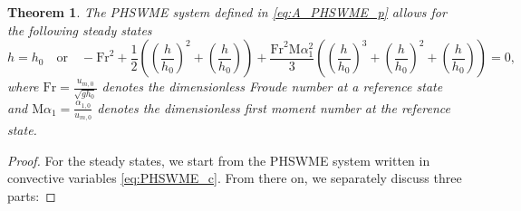 \documentclass[a4paper, 11pt]{article}
\newtheorem{theorem}{Theorem}
\newcommand{\Fr}{\textrm{Fr}} %
\newcommand{\Ma}{\textrm{M}\alpha} %
\begin{document}
\begin{theorem}\label{th:APHSWME_steady_states}
    The PHSWME system defined in \eqref{eq:A_PHSWME_p} allows for the following steady states
    \begin{equation}\label{eq:APHSWME_steady_states}
        h=h_0 \quad \textrm{or} \quad -\Fr^2 + \frac{1}{2} \left(\left(\frac{h}{h_0}\right)^2+\left(\frac{h}{h_0}\right)\right) + \frac{\Fr^2 \Ma_1^2}{3}  \left( \left(\frac{h}{h_0}\right)^3+\left(\frac{h}{h_0}\right)^2+\left(\frac{h}{h_0}\right)\right)=0,
    \end{equation}
    where $\Fr= \frac{u_{m,0}}{\sqrt{gh_0}}$ denotes the dimensionless Froude number at a reference state and $\Ma_1 = \frac{\alpha_{1,0}}{u_{m,0}}$ denotes the dimensionless first moment number at the reference state.
\end{theorem}
\begin{proof}
    For the steady states, we start from the PHSWME system written in convective variables \eqref{eq:PHSWME_c}. From there on, we separately discuss three parts:


\end{proof}
\end{document}
